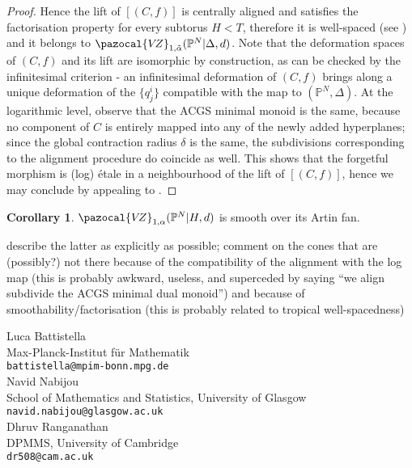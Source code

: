 \documentclass[11pt]{amsart}
\newcommand{\PP}{\mathbb P}
\newcommand{\VZ}{\pazocal{V\!Z}}
\theoremstyle{definition}
\newtheorem{cor}[thm]{Corollary}
\theoremstyle{definition}
\begin{document}
\begin{proof}
 Hence the lift of $[(C,f)]$ is centrally aligned and satisfies the factorisation property for every subtorus $H<T$, therefore it is well-spaced (see \cite[Definition 3.4.2]{RSPW2}) and it belongs to $\VZ_{1,\tilde\alpha}(\PP^N|\Delta,d)$. Note that the deformation spaces of $(C,f)$ and its lift are isomorphic by construction, as can be checked by the infinitesimal criterion - an infinitesimal deformation of $(C,f)$ brings along a unique deformation of the $\{q^i_j\}$ compatible with the map to $(\PP^N,\Delta)$. At the logarithmic level, observe that the ACGS minimal monoid is the same, because no component of $C$ is entirely mapped into any of the newly added hyperplanes; since the global contraction radius $\delta$ is the same, the subdivisions corresponding to the alignment procedure do coincide as well. This shows that the forgetful morphism is (log) \'etale in a neighbourhood of the lift of $[(C,f)]$, hence we may conclude by appealing to \cite[Theorem 3.5.1]{RSPW2}.
\end{proof}

\begin{cor}
 $\VZ_{1,\alpha}(\PP^N|H,d)$ is smooth over its Artin fan.
\end{cor}

{\color{gray} describe the latter as explicitly as possible; comment on the cones that are (possibly?) not there because of the compatibility of the alignment with the log map (this is probably awkward, useless, and superceded by saying ``we align subdivide the ACGS minimal dual monoid'') and because of smoothability/factorisation (this is probably related to tropical well-spacedness)}




\bigskip\bigskip

\noindent Luca Battistella\\
Max-Planck-Institut f\"ur Mathematik\\
\texttt{battistella@mpim-bonn.mpg.de}\\

\noindent Navid Nabijou \\
School of Mathematics and Statistics, University of Glasgow \\
\texttt{navid.nabijou@glasgow.ac.uk}\\

\noindent Dhruv Ranganathan \\
DPMMS, University of Cambridge \\
\texttt{dr508@cam.ac.uk}
\end{document}

